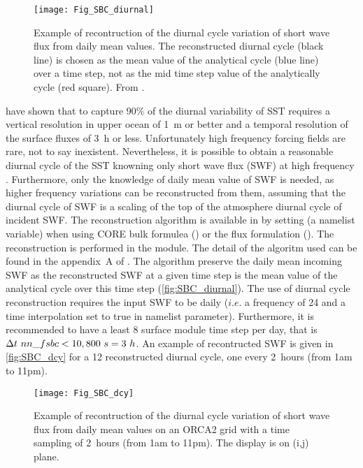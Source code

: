 \documentclass[../tex_main/NEMO_manual]{subfiles}
\begin{document}
\begin{figure}[!t]    \begin{center}
\texttt{[image: Fig\_SBC\_diurnal]}
\caption{ \protect\label{fig:SBC_diurnal}
  Example of recontruction of the diurnal cycle variation of short wave flux from daily mean values.
  The reconstructed diurnal cycle (black line) is chosen as
  the mean value of the analytical cycle (blue line) over a time step,
  not as the mid time step value of the analytically cycle (red square).
  From \citet{Bernie_al_CD07}.}
\end{center}   \end{figure}

\cite{Bernie_al_JC05} have shown that to capture 90$\%$ of the diurnal variability of SST requires a vertical resolution in upper ocean of 1~m or better and a temporal resolution of the surface fluxes of 3~h or less.
Unfortunately high frequency forcing fields are rare, not to say inexistent.
Nevertheless, it is possible to obtain a reasonable diurnal cycle of the SST knowning only short wave flux (SWF) at
high frequency \citep{Bernie_al_CD07}.
Furthermore, only the knowledge of daily mean value of SWF is needed,
as higher frequency variations can be reconstructed from them,
assuming that the diurnal cycle of SWF is a scaling of the top of the atmosphere diurnal cycle of incident SWF.
The \cite{Bernie_al_CD07} reconstruction algorithm is available in \NEMO by
setting  (a \textit{} namelist variable) when
using CORE bulk formulea () or
the flux formulation ().
The reconstruction is performed in the  module.
The detail of the algoritm used can be found in the appendix~A of \cite{Bernie_al_CD07}.
The algorithm preserve the daily mean incoming SWF as the reconstructed SWF at
a given time step is the mean value of the analytical cycle over this time step (\autoref{fig:SBC_diurnal}).
The use of diurnal cycle reconstruction requires the input SWF to be daily
($i.e.$ a frequency of 24 and a time interpolation set to true in  namelist parameter).
Furthermore, it is recommended to have a least 8 surface module time step per day,
that is  $\rdt \ nn\_fsbc < 10,800~s = 3~h$.
An example of recontructed SWF is given in \autoref{fig:SBC_dcy} for a 12 reconstructed diurnal cycle,
one every 2~hours (from 1am to 11pm).

\begin{figure}[!t]  \begin{center}
\texttt{[image: Fig\_SBC\_dcy]}
\caption{ \protect\label{fig:SBC_dcy}
  Example of recontruction of the diurnal cycle variation of short wave flux from
  daily mean values on an ORCA2 grid with a time sampling of 2~hours (from 1am to 11pm).
  The display is on (i,j) plane. }
\end{center}   \end{figure}
\end{document}
